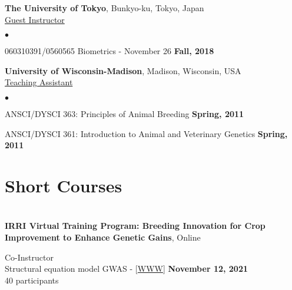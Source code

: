 \documentclass[margin,line,10pt]{res}
\newenvironment{list2}{
  \begin{list}{$\bullet$}{%
      \setlength{\itemsep}{0in}
      \setlength{\parsep}{0in} \setlength{\parskip}{0in}
      \setlength{\topsep}{0in} \setlength{\partopsep}{0in} 
      \setlength{\leftmargin}{0.2in}}}{\end{list}}
\begin{document}
\begin{resume}
  \vspace{1cm}

{\bf The University of Tokyo}, Bunkyo-ku, Tokyo, Japan \vspace{0.2cm} \\
\underline{Guest Instructor}
\vspace{0.4cm}
 \begin{list2}
 \item 060310391/0560565 Biometrics - November 26 \hfill {\bf Fall, 2018}
 \end{list2}


 \vspace{1cm}
 
{\bf University of Wisconsin-Madison}, Madison, Wisconsin, USA  \vspace{0.2cm}  \\
\underline{Teaching Assistant} 
 \vspace{0.4cm}
\begin{list2}
\item ANSCI/DYSCI 363: Principles of Animal Breeding    \hfill {\bf Spring, 2011}

\vspace{0.5cm}

\item ANSCI/DYSCI 361: Introduction to Animal and Veterinary Genetics    \hfill {\bf Spring, 2011} 

  \end{list2}



\vspace{0.5cm}
\section{\sc Short Courses}
\vspace{1cm}




\section{}


{\bf IRRI Virtual Training Program: Breeding Innovation for Crop Improvement to Enhance Genetic Gains}, Online
\vspace{.01pt}

Co-Instructor  \\
Structural equation model GWAS - [\textcolor{blue}{\href{}{WWW}}]
\hfill {\bf November 12, 2021} \\
40 participants




\end{resume}
\end{document}
